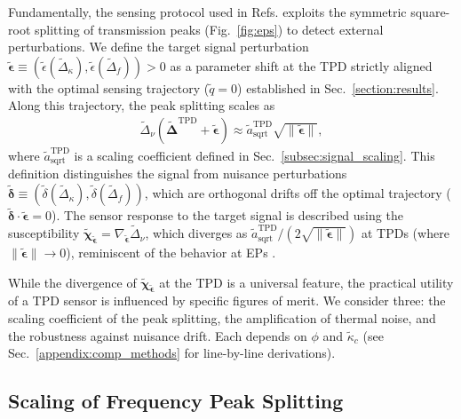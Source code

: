 \documentclass[%
  reprint,
  amsmath,amssymb,
  aps,
  prapplied,
  superscriptaddress,
  longbibliography]{revtex4-2}
\begin{document}
Fundamentally, the sensing protocol used in Refs. \cite{kononchuk_exceptional-point-based_2022, lu_harnessing_2025} exploits the symmetric square-root splitting of transmission peaks (Fig.~\ref{fig:eps}) to detect external perturbations. We define the target signal perturbation $\boldsymbol{\tilde{\epsilon}} \equiv (\tilde{\epsilon}(\tilde{\Delta}_\kappa), \tilde{\epsilon}(\tilde{\Delta}_f)) > 0$ as a parameter shift at the TPD strictly aligned with the optimal sensing trajectory ($\tilde{q} = 0$) established in Sec.~\ref{section:results}. Along this trajectory, the peak splitting scales as
\begin{align}
\tilde{\Delta}_\nu(\boldsymbol{\tilde{\Delta}}^\text{TPD}+\boldsymbol{\tilde{\epsilon}}) \approx  \tilde{a}_\text{sqrt}^\text{TPD} \sqrt{\lVert \boldsymbol{\tilde{\epsilon}} \rVert}, \label{eq:splitting_expansion_target}
\end{align}
where $\tilde{a}_\text{sqrt}^\text{TPD}$ is a scaling coefficient defined in Sec.~\ref{subsec:signal_scaling}.  
This definition distinguishes the signal from nuisance perturbations $\boldsymbol{\tilde{\delta}} \equiv (\tilde{\delta}(\tilde{\Delta}_\kappa), \tilde{\delta}(\tilde{\Delta}_f))$, which are orthogonal drifts off the optimal trajectory ($\boldsymbol{\tilde{\delta}} \cdot \boldsymbol{\tilde{\epsilon}} = 0$). The sensor response to the target signal is described using the susceptibility $\boldsymbol{\tilde{\chi}}_{\boldsymbol{\tilde{\epsilon}}} = \nabla_{\boldsymbol{\tilde{\epsilon}}} \tilde{\Delta}_\nu$, which diverges as $\tilde{a}_\text{sqrt}^\text{TPD}/(2\sqrt{\lVert\boldsymbol{\tilde{\epsilon}}\rVert})$ at TPDs (where $\lVert\boldsymbol{\tilde{\epsilon}}\rVert \to 0$), reminiscent of the behavior at EPs \cite{wiersig_enhancing_2014}.

While the divergence of $\boldsymbol{\tilde{\chi}}_{\boldsymbol{\tilde{\epsilon}}}$ at the TPD is a universal feature, the practical utility of a TPD sensor is influenced by specific figures of merit. We consider three: the scaling coefficient of the peak splitting, the amplification of thermal noise, and the robustness against nuisance drift. Each depends on $\phi$ and $\tilde{\kappa}_c$ (see Sec.~\ref{appendix:comp_methods} for line-by-line derivations).

\subsection{\label{subsec:signal_scaling}Scaling of Frequency Peak Splitting}
\end{document}
